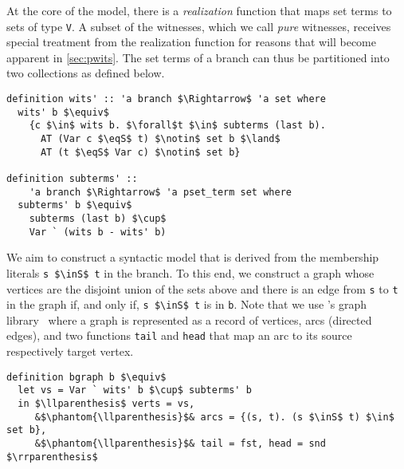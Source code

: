 \documentclass[sigplan,10pt,anonymous,review]{acmart}
\newcommand{\inS}{\in_\text{s}}
\newcommand{\eqS}{=_\text{s}}
\begin{document}
At the core of the model, there is a \textit{realization} function that maps set terms to sets of type \lstinline!V!.
A subset of the witnesses, which we call \textit{pure} witnesses, receives special treatment from the realization function for reasons that will become apparent in \autoref{sec:pwits}.
The set terms of a branch can thus be partitioned into two collections as defined below.
\begin{lstlisting}
definition wits' :: 'a branch $\Rightarrow$ 'a set where
  wits' b $\equiv$
    {c $\in$ wits b. $\forall$t $\in$ subterms (last b).
      AT (Var c $\eqS$ t) $\notin$ set b $\land$
      AT (t $\eqS$ Var c) $\notin$ set b} 

definition subterms' ::
    'a branch $\Rightarrow$ 'a pset_term set where
  subterms' b $\equiv$
    subterms (last b) $\cup$ 
    Var ` (wits b - wits' b)
\end{lstlisting}

We aim to construct a syntactic model that is derived from the membership literals \lstinline!s $\inS$ t! in the branch.
To this end, we construct a graph whose vertices are the disjoint union of the sets above and there is an edge from \lstinline!s! to \lstinline!t! in the graph if, and only if, \lstinline!s $\inS$ t! is in \lstinline!b!.
Note that we use \citeauthor{graph_theory_afp}'s graph library~\cite{graph_theory_afp} where a graph is represented as a record of vertices, arcs (directed edges), and two functions \lstinline!tail! and \lstinline!head! that map an arc to its source respectively target vertex.
\begin{lstlisting}
definition bgraph b $\equiv$
  let vs = Var ` wits' b $\cup$ subterms' b
  in $\llparenthesis$ verts = vs,
     &$\phantom{\llparenthesis}$& arcs = {(s, t). (s $\inS$ t) $\in$ set b},
     &$\phantom{\llparenthesis}$& tail = fst, head = snd $\rrparenthesis$
\end{lstlisting}
\end{document}
